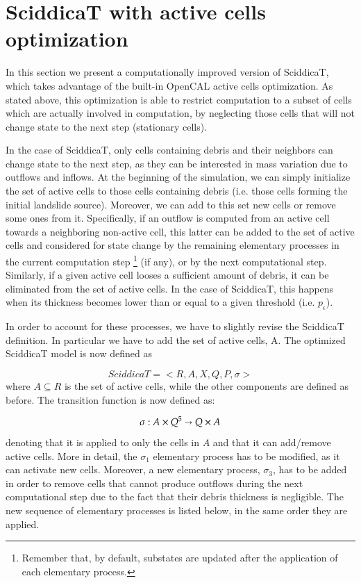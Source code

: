 \section{SciddicaT with active cells optimization}\label{sec:sciddicaT_active}
In this section we present a computationally improved version of SciddicaT, which
takes advantage of the built-in OpenCAL active cells optimization. As
stated above, this optimization is able to restrict computation to a
subset of cells which are actually involved in computation, by
neglecting those cells that will not change state to
the next step (stationary cells).

In the case of SciddicaT, only cells containing debris and their
neighbors can change state to the next step, as they can be
interested in mass variation due to outflows and inflows. At the
beginning of the simulation, we can simply initialize the set of
active cells to those cells containing debris (i.e. those cells
forming the initial landslide source). Moreover, we can add to this
set new cells or remove some ones from it. Specifically, if an outflow
is computed from an active cell towards a neighboring non-active
cell, this latter can be added to the set of active cells and
considered for state change by the remaining elementary processes in
the current computation step \footnote{Remember that, by default,
  substates are updated after the application of each elementary
  process.} (if any), or by the next computational step. Similarly, if
a given active cell looses a sufficient amount of debris, it can be
eliminated from the set of active cells. In the case of SciddicaT,
this happens when its thickness becomes lower than or equal to a given
threshold (i.e. $p_\epsilon$).

In order to account for these processes, we have to slightly revise
the SciddicaT definition. In particular we have to add the set of
active cells, A. The optimized SciddicaT model is now defined as

$$SciddicaT = < R, A, X, Q , P, \sigma >$$
where $A \subseteq R$ is the set of active cells, while the other
components are defined as before. The transition function is now defined as:

$$\sigma : A \times Q^5 \shortrightarrow Q \times A$$ denoting that it
is applied to only the cells in $A$ and that it can add/remove active
cells. More in detail, the $\sigma_1$ elementary process has to be
modified, as it can activate new cells. Moreover, a new elementary
process, $\sigma_3$, has to be added in order to remove cells that
cannot produce outflows during the next computational step due to the
fact that their debris thickness is negligible. The new sequence of
elementary processes is listed below, in the same order they are
applied.

